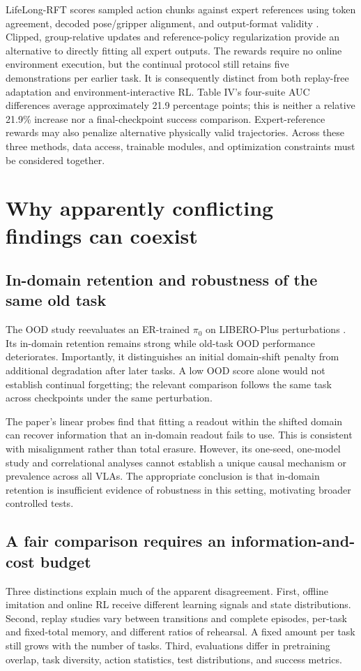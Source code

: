 \documentclass[11pt,a4paper]{article}
\begin{document}
LifeLong-RFT scores sampled action chunks against expert references using token agreement, decoded pose/gripper alignment, and output-format validity \cite{lifelong}. Clipped, group-relative updates and reference-policy regularization provide an alternative to directly fitting all expert outputs. The rewards require no online environment execution, but the continual protocol still retains five demonstrations per earlier task. It is consequently distinct from both replay-free adaptation and environment-interactive RL. Table IV's four-suite AUC differences average approximately 21.9 percentage points; this is neither a relative 21.9\% increase nor a final-checkpoint success comparison. Expert-reference rewards may also penalize alternative physically valid trajectories. Across these three methods, data access, trainable modules, and optimization constraints must be considered together.

\section{Why apparently conflicting findings can coexist}
\subsection{In-domain retention and robustness of the same old task}
The OOD study reevaluates an ER-trained $\pi_0$ on LIBERO-Plus perturbations \cite{ood}. Its in-domain retention remains strong while old-task OOD performance deteriorates. Importantly, it distinguishes an initial domain-shift penalty from additional degradation after later tasks. A low OOD score alone would not establish continual forgetting; the relevant comparison follows the same task across checkpoints under the same perturbation.

The paper's linear probes find that fitting a readout within the shifted domain can recover information that an in-domain readout fails to use. This is consistent with misalignment rather than total erasure. However, its one-seed, one-model study and correlational analyses cannot establish a unique causal mechanism or prevalence across all VLAs. The appropriate conclusion is that in-domain retention is insufficient evidence of robustness in this setting, motivating broader controlled tests.

\subsection{A fair comparison requires an information-and-cost budget}
Three distinctions explain much of the apparent disagreement. First, offline imitation and online RL receive different learning signals and state distributions. Second, replay studies vary between transitions and complete episodes, per-task and fixed-total memory, and different ratios of rehearsal. A fixed amount per task still grows with the number of tasks. Third, evaluations differ in pretraining overlap, task diversity, action statistics, test distributions, and success metrics.
\end{document}
